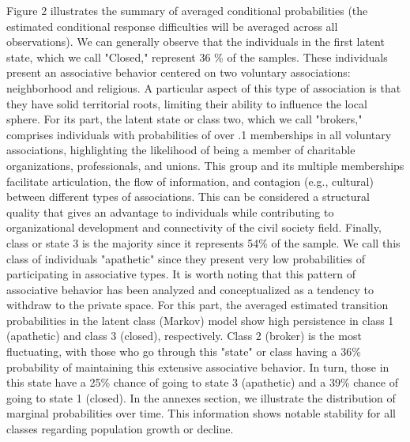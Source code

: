 Figure 2 illustrates the summary of averaged conditional probabilities (the estimated conditional response difficulties will be averaged across all observations). We can generally observe that the individuals in the first latent state, which we call "Closed," represent 36 \% of the samples. These individuals present an associative behavior centered on two voluntary associations: neighborhood and religious. A particular aspect of this type of association is that they have solid territorial roots, limiting their ability to influence the local sphere. For its part, the latent state or class two, which we call "brokers," comprises individuals with probabilities of over .1 memberships in all voluntary associations, highlighting the likelihood of being a member of charitable organizations, professionals, and unions. This group and its multiple memberships facilitate articulation, the flow of information, and contagion (e.g., cultural) between different types of associations. This can be considered a structural quality that gives an advantage to individuals while contributing to organizational development and connectivity of the civil society field. Finally, class or state 3 is the majority since it represents 54\% of the sample. We call this class of individuals "apathetic" since they present very low probabilities of participating in associative types. It is worth noting that this pattern of associative behavior has been analyzed and conceptualized as a tendency to withdraw to the private space. For this part, the averaged estimated transition probabilities in the latent class (Markov) model show high persistence in class 1 (apathetic) and class 3 (closed), respectively. Class 2 (broker) is the most fluctuating, with those who go through this "state" or class having a 36\% probability of maintaining this extensive associative behavior. In turn, those in this state have a 25\% chance of going to state 3 (apathetic) and a 39\% chance of going to state 1 (closed). In the annexes section, we illustrate the distribution of marginal probabilities over time. This information shows notable stability for all classes regarding population growth or decline.


\bigskip

